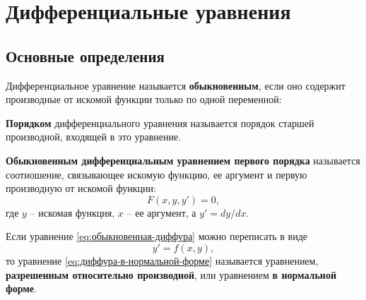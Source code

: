 \documentclass[a5paper, 11pt]{extbook}
\theoremstyle{definition}
\theoremstyle{definition}
\newtheorem{definition}{Определение}[section]
\theoremstyle{definition}
\begin{document}






\chapter{Дифференциальные уравнения}

\section{Основные определения}

Дифференциальное уравнение называется \textbf{обыкновенным}, если оно содержит производные от искомой функции только по одной переменной:

\textbf{Порядком} дифференциального уравнения называется порядок старшей производной, входящей в это уравнение.

\textbf{Обыкновенным дифференциальным уравнением первого порядка} называется соотношение, связывающее искомую функцию, ее аргумент и первую производную от искомой функции:
\begin{equation}
    \label{eq:обыкновенная-диффура}
    F(x, y, y') = 0,
\end{equation}
где \(y\) -- искомая функция, \(x\) -- ее аргумент, а \(y' = dy / dx\).

\label{def:диффура-в-нормальной-форме}
Если уравнение \eqref{eq:обыкновенная-диффура} можно переписать в виде
\begin{equation}
    \label{eq:диффура-в-нормальной-форме}
    y' = f(x, y),
\end{equation}
то уравнение \eqref{eq:диффура-в-нормальной-форме} называется уравнением, \textbf{разрешенным относительно производной}, или уравнением \textbf{в нормальной форме}.
\end{document}
